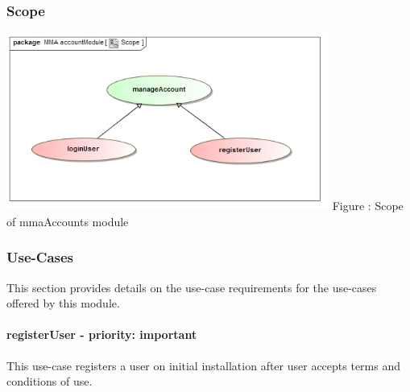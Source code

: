 \documentclass[hidelinks, 12pt, oneside]{article}
\begin{document}
	\subsubsection{Scope}
	\includegraphics[width=400px,height=220px]{img/scopeAccounts.jpg}
		Figure : Scope of mmaAccounts module
	\subsubsection{Use-Cases}
		This section provides details on the use-case requirements for the use-cases offered by this module.
	\paragraph{registerUser - priority: important}
		This use-case registers a user on initial installation after user accepts terms and conditions of use.
	
\end{document}
